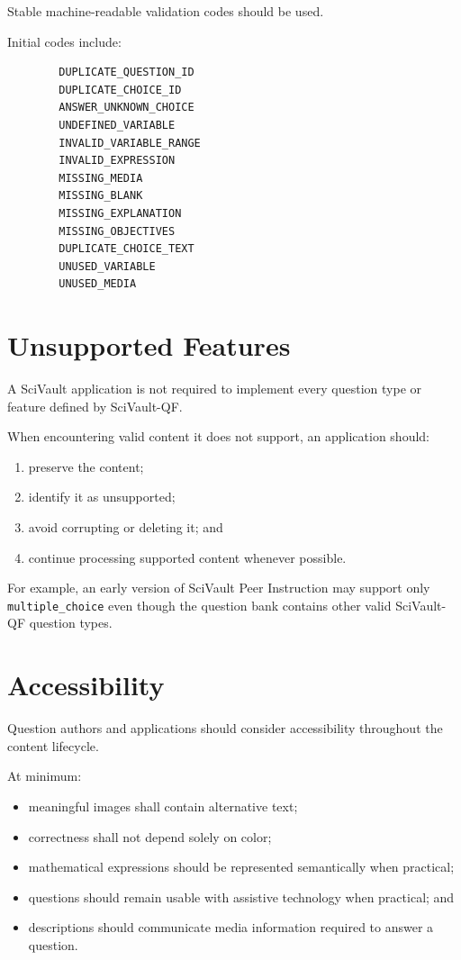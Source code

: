 \documentclass[11pt]{article}
\begin{document}
	Stable machine-readable validation codes should be used.
	
	Initial codes include:
	
	\begin{lstlisting}
		DUPLICATE_QUESTION_ID
		DUPLICATE_CHOICE_ID
		ANSWER_UNKNOWN_CHOICE
		UNDEFINED_VARIABLE
		INVALID_VARIABLE_RANGE
		INVALID_EXPRESSION
		MISSING_MEDIA
		MISSING_BLANK
		MISSING_EXPLANATION
		MISSING_OBJECTIVES
		DUPLICATE_CHOICE_TEXT
		UNUSED_VARIABLE
		UNUSED_MEDIA
	\end{lstlisting}
	
	\section{Unsupported Features}
	
	A SciVault application is not required to implement every question type or
	feature defined by SciVault-QF.
	
	When encountering valid content it does not support, an application should:
	
	\begin{enumerate}
		\item preserve the content;
		\item identify it as unsupported;
		\item avoid corrupting or deleting it; and
		\item continue processing supported content whenever possible.
	\end{enumerate}
	
	For example, an early version of SciVault Peer Instruction may support only
	\texttt{multiple\_choice} even though the question bank contains other
	valid SciVault-QF question types.
	
	\section{Accessibility}
	
	Question authors and applications should consider accessibility throughout
	the content lifecycle.
	
	At minimum:
	
	\begin{itemize}
		\item meaningful images shall contain alternative text;
		\item correctness shall not depend solely on color;
		\item mathematical expressions should be represented semantically when
		practical;
		\item questions should remain usable with assistive technology when
		practical; and
		\item descriptions should communicate media information required to
		answer a question.
	\end{itemize}
	
\end{document}
